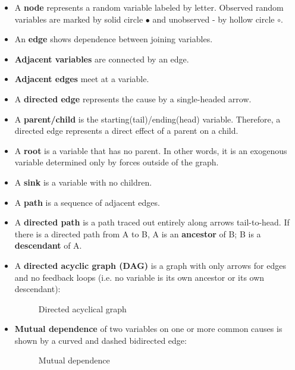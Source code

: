 \begin{itemize}

\item A \textbf{node} represents a random variable labeled by letter. Observed random variables are marked by solid circle $\bullet$ and unobserved - by hollow circle \( \circ \).

\item An \textbf{edge} shows dependence between joining variables.

\item \textbf{Adjacent variables} are connected by an edge.

\item \textbf{Adjacent edges} meet at a variable.

\item A \textbf{directed edge} represents the cause by a single-headed arrow.

\item A \textbf{parent/child} is the starting(tail)/ending(head) variable. Therefore, a directed edge represents a direct effect of a parent on a child.

\item A \textbf{root} is a variable that has no parent. In other words, it is an exogenous variable determined only by forces outside of the graph.

\item A \textbf{sink} is a variable with no children.

\item A \textbf{path} is a sequence of adjacent edges.

\item A \textbf{directed path} is a path traced out entirely along arrows tail-to-head. If there is a directed path from A to B,  A is an \textbf{ancestor} of B; B is a  \textbf{descendant} of A.

\item A \textbf{directed acyclic graph (DAG)} is a graph with only arrows for edges and no feedback loops (i.e. no variable is its own ancestor or its own descendant):

\begin{figure}[htp]\centering
\caption{Directed acyclical graph}\vspace{0.3cm}
\end{figure}

\item \textbf{Mutual dependence} of two variables on one or more common causes is shown by a curved and dashed bidirected edge:

\begin{figure}[htp]\centering
\caption{Mutual dependence}\vspace{0.3cm}
\end{figure}

\end{itemize}

